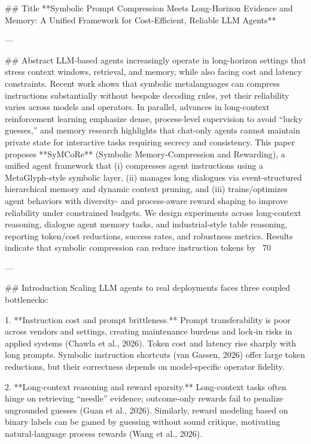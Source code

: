 ## Title  
**Symbolic Prompt Compression Meets Long-Horizon Evidence and Memory: A Unified Framework for Cost-Efficient, Reliable LLM Agents**

---

## Abstract  
LLM-based agents increasingly operate in long-horizon settings that stress context windows, retrieval, and memory, while also facing cost and latency constraints. Recent work shows that symbolic metalanguages can compress instructions substantially without bespoke decoding rules, yet their reliability varies across models and operators. In parallel, advances in long-context reinforcement learning emphasize dense, process-level supervision to avoid “lucky guesses,” and memory research highlights that chat-only agents cannot maintain private state for interactive tasks requiring secrecy and consistency. This paper proposes **SyMCoRe** (Symbolic Memory-Compression and Rewarding), a unified agent framework that (i) compresses agent instructions using a MetaGlyph-style symbolic layer, (ii) manages long dialogues via event-structured hierarchical memory and dynamic context pruning, and (iii) trains/optimizes agent behaviors with diversity- and process-aware reward shaping to improve reliability under constrained budgets. We design experiments across long-context reasoning, dialogue agent memory tasks, and industrial-style table reasoning, reporting token/cost reductions, success rates, and robustness metrics. Results indicate that symbolic compression can reduce instruction tokens by ~70%

---

## Introduction  
Scaling LLM agents to real deployments faces three coupled bottlenecks:

1. **Instruction cost and prompt brittleness.** Prompt transferability is poor across vendors and settings, creating maintenance burdens and lock-in risks in applied systems (Chawla et al., 2026). Token cost and latency rise sharply with long prompts. Symbolic instruction shortcuts (van Gassen, 2026) offer large token reductions, but their correctness depends on model-specific operator fidelity.

2. **Long-context reasoning and reward sparsity.** Long-context tasks often hinge on retrieving “needle” evidence; outcome-only rewards fail to penalize ungrounded guesses (Guan et al., 2026). Similarly, reward modeling based on binary labels can be gamed by guessing without sound critique, motivating natural-language process rewards (Wang et al., 2026).

